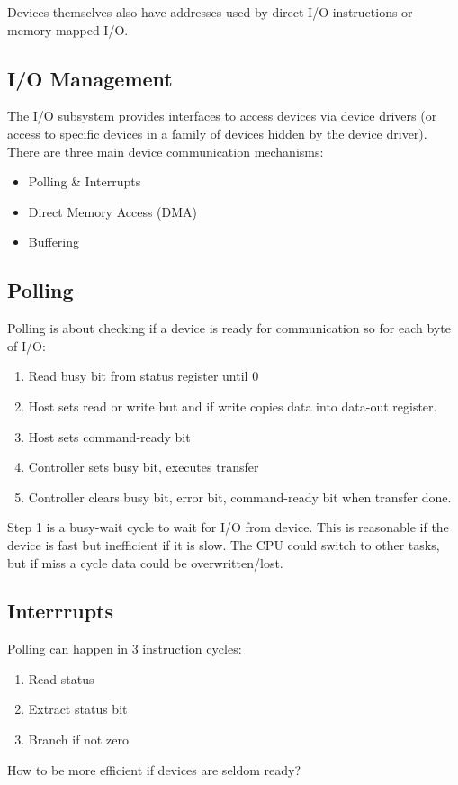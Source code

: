 \documentclass[11pt]{article}
\begin{document}
Devices themselves also have addresses used by direct I/O instructions or memory-mapped I/O.

\subsection{I/O Management}
\label{sec:orgfa5f7c5}
The I/O subsystem provides interfaces to access devices via device drivers (or access to specific devices in a family of devices hidden by the device driver).
There are three main device communication mechanisms:
\begin{itemize}
\item Polling \& Interrupts
\item Direct Memory Access (DMA)
\item Buffering
\end{itemize}

\subsection{Polling}
\label{sec:org00ce911}
Polling is about checking if a device is ready for communication so for each byte of I/O:
\begin{enumerate}
\item Read busy bit from status register until 0
\item Host sets read or write but and if write copies data into data-out register.
\item Host sets command-ready bit
\item Controller sets busy bit, executes transfer
\item Controller clears busy bit, error bit, command-ready bit when transfer done.
\end{enumerate}
Step 1 is a busy-wait cycle to wait for I/O from device.
This is reasonable if the device is fast but inefficient if it is slow.
The CPU could switch to other tasks, but if miss a cycle data could be overwritten/lost.

\subsection{Interrrupts}
\label{sec:org64067cc}
Polling can happen in 3 instruction cycles:
\begin{enumerate}
\item Read status
\item Extract status bit
\item Branch if not zero
\end{enumerate}
How to be more efficient if devices are seldom ready?
\end{document}
